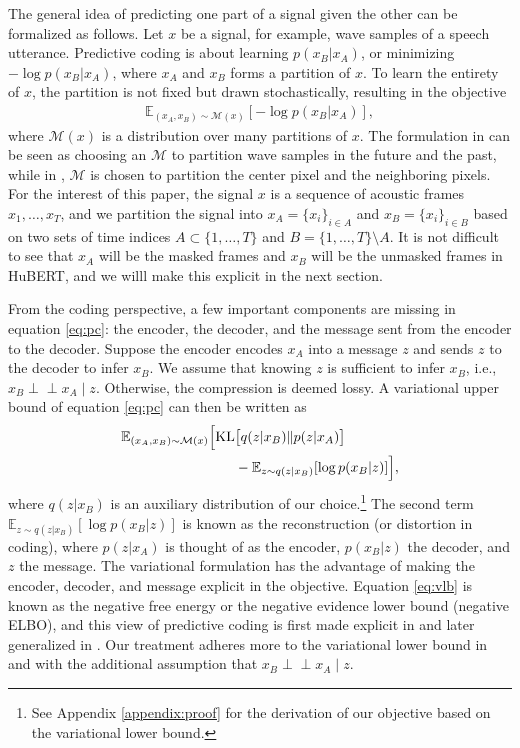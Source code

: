 \documentclass[11pt,a4paper]{article}
\newcommand{\KL}{\mathrm{KL}}
\newcommand{\ind}{\perp\!\!\!\!\perp}
\begin{document}
The general idea of predicting one part of a signal given the other can
be formalized as follows.  Let $x$ be a signal, for example, wave samples
of a speech utterance.  Predictive coding is about learning $p(x_B |
x_A)$, or minimizing $-\log p(x_B | x_A)$, where $x_A$ and $x_B$ forms
a partition of $x$.  To learn the entirety of $x$, the partition is not
fixed but drawn stochastically, resulting in the objective
\begin{align}
\mathbb{E}_{(x_A, x_B) \sim \mathcal{M}(x)}[-\log p(x_B | x_A)],
\label{eq:pc}
\end{align}
where $\mathcal{M}(x)$ is a distribution over many partitions of $x$.
The formulation in \citet{atal1971speech} can be seen as choosing an
$\mathcal{M}$ to partition wave samples in the future and the past,
while in \citet{srinivasan1982predictive}, $\mathcal{M}$ is chosen
to partition the center pixel and the neighboring pixels.  For the
interest of this paper, the signal $x$ is a sequence of acoustic frames $x_1,
\dots, x_T$, and we partition the signal into
$x_A=\{x_i\}_{i \in A}$ and $x_B = \{x_i\}_{i \in B}$
based on two sets of time indices $A \subset \{1,\dots,T\}$
and $B = \{1,\dots,T\} \setminus A$.
It is not difficult to see that $x_A$ will be the masked frames
and $x_B$ will be the unmasked frames in HuBERT,
and we willl make this explicit in the next section.
%
%
%

%
%
%
%
%
%
%
%
%
%
%
%
%
%
%

From the coding perspective,
a few important components are missing in equation \ref{eq:pc}: the encoder, the decoder, and the message sent from the encoder to the decoder.
Suppose the encoder encodes $x_A$ into a message $z$ and sends $z$ to the decoder to infer $x_B$.
We assume that knowing $z$ is sufficient to infer $x_B$, i.e., $x_B \ind x_A \mid z$.
Otherwise, the compression is deemed lossy.
A variational upper bound of equation \ref{eq:pc} can then be written as
\begin{align}
  \mathbb{E}_{(x_A, x_B) \sim \mathcal{M}(x)} \Big[ \KL & \big[ q(z|x_B)\|p(z|x_A)\big] \label{eq:vlb} \\
  & - \mathbb{E}_{z \sim q(z|x_B)}[\log p(x_B | z)] \Big], \notag
\end{align}
where $q(z|x_B)$ is an auxiliary distribution of our choice.\footnote{See Appendix \ref{appendix:proof} for the derivation of our objective based on the variational lower bound.} 
The second term $\mathbb{E}_{z \sim q(z|x_B)}[\log p(x_B | z)]$ 
is known as the reconstruction (or distortion in coding),
where $p(z|x_A)$ is thought of as the encoder, $p(x_B | z)$ the decoder, and $z$ the message.
The variational formulation has the advantage of making
the encoder, decoder, and message explicit in the objective.
Equation \ref{eq:vlb} is known as the negative free energy or the negative evidence lower bound (negative ELBO), 
and this view of predictive coding is first made explicit in \citet{friston2009predictive} and later generalized in \citet{feldman2010attention}.
Our treatment adheres more to the variational lower bound in \citet{Kingma2014} and \citet{sohn2015learning} 
with the additional assumption that $x_B \ind x_A \mid z$.
\end{document}
